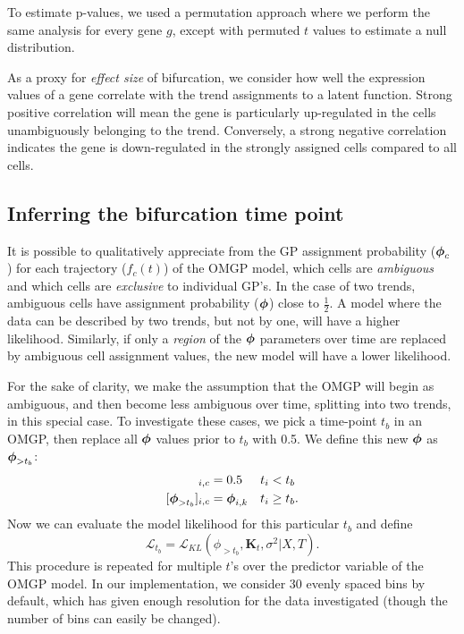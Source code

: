 To estimate p-values, we used a permutation approach where we perform the same analysis for every gene $ g $, except with permuted $ t $ values to estimate a null distribution.

As a proxy for \textit{effect size} of bifurcation, we consider how well the expression values of a gene correlate with the trend assignments to a latent function. Strong positive correlation will mean the gene is particularly up-regulated in the cells unambiguously belonging to the trend. Conversely, a strong negative correlation indicates the gene is down-regulated in the strongly assigned cells compared to all cells.

\subsection{Inferring the bifurcation time point} \label{sec:breakpoint}

It is possible to qualitatively appreciate from the GP assignment probability ($ \mbox{\boldmath $\phi$}_c $ ) for each trajectory ($ f_c(t) $) of the OMGP model, which cells are \textit{ambiguous}  and which cells are \textit{exclusive} to individual GP's. In the case of two trends, ambiguous cells have assignment probability ($ \mbox{\boldmath $\phi$} $) close to \( \frac{1}{2} \). A model where the data can be described by two trends, but not by one, will have a higher likelihood. Similarly, if only a \textit{region} of the $ \mbox{\boldmath $\phi$} $ parameters over time are replaced by ambiguous cell assignment values, the new model will have a lower likelihood.

For the sake of clarity, we make the assumption that the OMGP will begin as ambiguous, and then become less ambiguous over time, splitting into two trends, in this special case. To investigate these cases, we pick a time-point $ t_b $ in an OMGP, then replace all $ \mbox{\boldmath $\phi$} $ values prior to $ t_b $ with 0.5. We define this new $ \mbox{\boldmath $\phi$} $ as $ \mbox{\boldmath $\phi$}_{> t_b} $:
\begin{align*}
[\bphi_{> t_b}]_{i,c} &= 0.5 & & t_i < t_b \\
[\bphi_{> t_b}]_{i,c} &= \bphi_{i,k} & & t_i \geq t_b.
\end{align*}
Now we can evaluate the model likelihood for this particular $ t_b $ and define
\[ \mathcal{L}_{t_b} = \mathcal{L}_{KL} (\phi_{> t_b}, \mathbf{K}_t, \sigma^2 | X, T ). \]
This procedure is repeated for multiple $ t $’s over the predictor variable of the OMGP model. In our implementation, we consider 30 evenly spaced bins by default, which has given enough resolution for the data investigated (though the number of bins can easily be changed).

